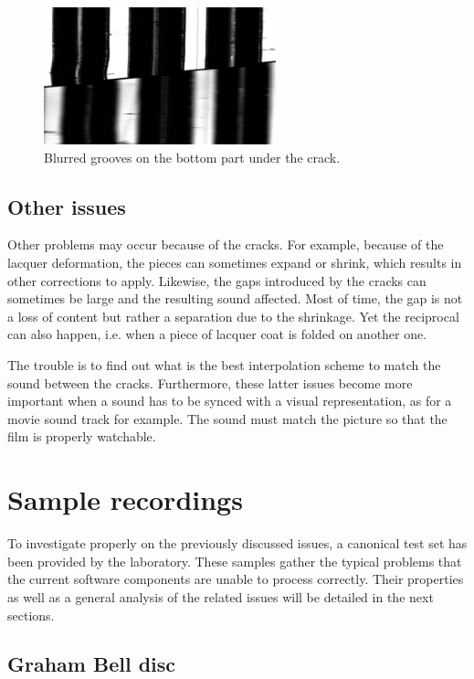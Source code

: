 \begin{figure}[!ht]
\centering
\includegraphics[width=0.6\textwidth]{images/blurred-grooves}
\caption{Blurred grooves on the bottom part under the crack.}
\label{fig:blurredgrooves}
\end{figure}

\subsection{Other issues}

Other problems may occur because of the cracks. For example, because of the lacquer deformation, the pieces can sometimes expand or shrink, which results in other corrections to apply. Likewise, the gaps introduced by the cracks can sometimes be large and the resulting sound affected. Most of time, the gap is not a loss of content but rather a separation due to the shrinkage. Yet the reciprocal can also happen, i.e. when a piece of lacquer coat is folded on another one.

The trouble is to find out what is the best interpolation scheme to match the sound between the cracks. Furthermore, these latter issues become more important when a sound has to be synced with a visual representation, as for a movie sound track for example. The sound must match the picture so that the film is properly watchable.

\section{Sample recordings}
\label{sec:samplerec}

To investigate properly on the previously discussed issues, a canonical test set has been provided by the laboratory. These samples gather the typical problems that the current software components are unable to process correctly. Their properties as well as a general analysis of the related issues will be detailed in the next sections.

\subsection{Graham Bell disc}

